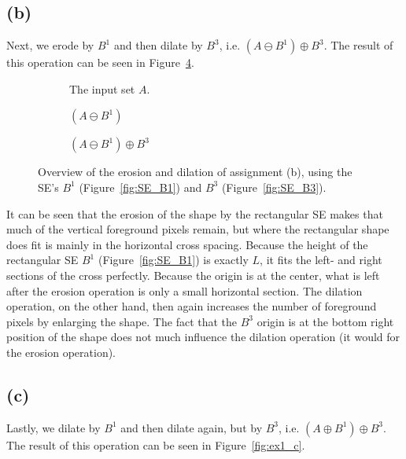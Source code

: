 \documentclass{article}
\begin{document}
\subsection*{(b)} Next, we erode by $B^1$ and then dilate by $B^3$, i.e. $(A \ominus B^1) \oplus B^3$. The result of this operation can be seen in Figure~\ref{fig:ex1_b}.

\begin{figure}[H]
     \centering
     \begin{subfigure}[b]{0.28\textwidth}
         \centering
         
         \caption{The input set $A$.}
         \label{fig:ex1_b-inputset}
     \end{subfigure}
     \hfill
     \begin{subfigure}[b]{0.29\textwidth}
         \centering
         
         \caption{$(A \ominus B^1)$}
         \label{fig:ex1_b-step1}
     \end{subfigure}
     \hfill
     \begin{subfigure}[b]{0.37\textwidth}
         \centering
         
         \caption{$(A \ominus B^1) \oplus B^3$}
         \label{fig:ex1_b-step2}
     \end{subfigure}
     
    \caption{Overview of the erosion and dilation of assignment (b), using the SE's $B^1$ (Figure~\ref{fig:SE_B1}) and $B^3$ (Figure~\ref{fig:SE_B3}).}
    \label{fig:ex1_b}
\end{figure}

It can be seen that the erosion of the shape by the rectangular SE makes that much of the vertical foreground pixels remain, but where the rectangular shape does fit is mainly in the horizontal cross spacing. Because the height of the rectangular SE $B^1$ (Figure~\ref{fig:SE_B1}) is exactly $L$, it fits the left- and right sections of the cross perfectly. Because the origin is at the center, what is left after the erosion operation is only a small horizontal section. The dilation operation, on the other hand, then again increases the number of foreground pixels by enlarging the shape. The fact that the $B^3$ origin is at the bottom right position of the shape does not much influence the dilation operation (it would for the erosion operation).

\subsection*{(c)} Lastly, we dilate by $B^1$ and then dilate again, but by $B^3$, i.e. $(A \oplus B^1) \oplus B^3$. The result of this operation can be seen in Figure~\ref{fig:ex1_c}.
\end{document}

